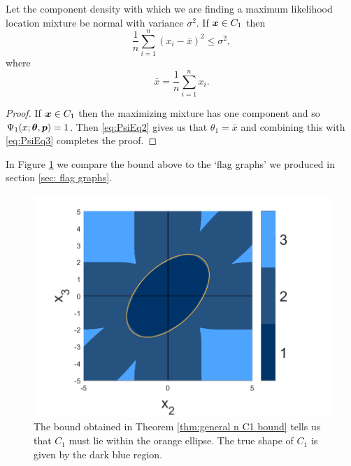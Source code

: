 	\begin{theorem}
		\label{thm:general n C1 bound}
		Let the component density with which we are finding a maximum likelihood location mixture be normal with variance $\sigma^2$. If ${\bm{{x}}} \in C_1$ then 
		\begin{equation}
			\frac{1}{n} \sum_{i=1}^n (x_i - \bar{x})^2 \leq \sigma^2,
		\end{equation}
		where 
		\begin{equation}
			\bar{x} = \frac{1}{n}\sum_{i = 1}^n x_i.
		\end{equation}
	\end{theorem}
	\begin{proof}
		If ${\bm{{x}}} \in C_1$ then the maximizing mixture has one component and so $\Psi_1(x; {\bm{{\theta}}}, {\bm{{p}}}) = 1$. Then \eqref{eq:PsiEq2} gives us that $\theta_1 = \bar{x}$ and combining this with \eqref{eq:PsiEq3} completes the proof.
	\end{proof}
	In Figure \ref{fig:flag graph m1 bound} we compare the bound above to the `flag graphs' we produced in section \ref{sec: flag graphs}.

	\begin{figure}
		\centering
		\includegraphics[width = \textwidth]{Figures/Mixtures/normal_flag_graph_m1_bound.png}
		\caption{The bound obtained in Theorem \ref{thm:general n C1 bound} tells us that $C_1$ must lie within the orange ellipse. The true shape of $C_1$ is given by the dark blue region.}
		\label{fig:flag graph m1 bound}
	\end{figure}


